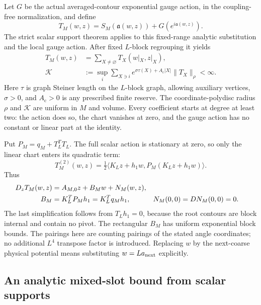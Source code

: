Let $G$ be the actual averaged-contour exponential gauge action, in the
coupling-free normalization, and define
\begin{equation}
 T_M(w,z)=S_M(\mathfrak a(w,z))+G(e^{i\mathfrak a(w,z)}).
                                                               \label{st-action}
\end{equation}
The strict scalar support theorem applies to this fixed-range analytic
substitution and the local gauge action. After fixed $L$-block
regrouping it yields
\begin{align}
 T_M(w,z)&=\sum_{X\ne\varnothing}T_X(w|_X,z|_X),             \label{st-scalar-expansion}\\
 \mathcal K&:=\sup_i\sum_{X\ni i}
 e^{\sigma\tau(X)+A_{\mathrm c}|X|}\|T_X\|_\rho<\infty.         \label{st-scalar-norm}
\end{align}
Here $\tau$ is graph Steiner length on the $L$-block graph, allowing
auxiliary vertices, $\sigma>0$, and $A_{\mathrm c}>0$ is any prescribed
finite reserve. The coordinate-polydisc radius $\rho$ and $\mathcal K$
are uniform in $M$ and volume. Every coefficient starts at degree at
least two: the action does so, the chart vanishes at zero, and the gauge
action has no constant or linear part at the identity.

Put $P_M=q_M+T_L^TT_L$. The full scalar action is stationary at zero, so
only the linear chart enters its quadratic term:
\begin{equation}
 T_M^{(2)}(w,z)=\tfrac12
 \langle K_Lz+h_1w,P_M(K_Lz+h_1w)\rangle.                    \label{st-quadratic-action}
\end{equation}
Thus
\begin{align}
 D_zT_M(w,z)&=A_{M,0}z+B_Mw+N_M(w,z),\notag\\
 B_M&=K_L^TP_Mh_1=K_L^Tq_Mh_1,&
 N_M(0,0)&=DN_M(0,0)=0.                                    \label{st-gradient-split}
\end{align}
The last simplification follows from $T_Lh_1=0$, because the root
contours are block internal and contain no pivot. The rectangular
$B_M$ has uniform exponential block bounds. The pairings here are
counting pairings of the stated angle coordinates; no additional
$L^4$ transpose factor is introduced. Replacing $w$ by the next-coarse
physical potential means substituting $w=L a_{\rm next}$ explicitly.

\subsection{An analytic mixed-slot bound from scalar supports}
\label{st-gradient-section}

